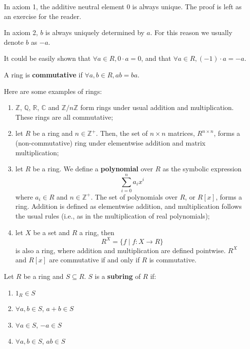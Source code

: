 \documentclass[12pt, a4paper, titlepage]{report}
\begin{document}
\begin{rem}
  In axiom 1, the additive neutral element $0$ is always unique. The proof is left as an exercise for the reader.
\end{rem}

\begin{rem}
  In axiom 2, $b$ is always uniquely determined by $a$. For this reason we usually denote $b$ as $-a$.
\end{rem}

\begin{rem}
  It could be easily shown that $\forall a \in R, 0 \cdot a = 0$, and that $\forall a \in R, (-1) \cdot a = -a$.
\end{rem}

\begin{defn}
  A ring is \textbf{commutative} if $\forall a, b \in R, ab = ba$.
\end{defn}

\begin{exmp}
  Here are some examples of rings:
  \begin{enumerate}
  \item $\mathbb{Z}$, $\mathbb{Q}$, $\mathbb{R}$, $\mathbb{C}$ and $\mathbb{Z}/n\mathbb{Z}$ form rings under usual
    addition and multiplication. These rings are all commutative;
  \item let $R$ be a ring and $n \in \mathbb{Z}^{+}$. Then, the set of $n \times n$ matrices, $R^{n \times n}$, forms a
    (non-commutative) ring under elementwise addition and matrix multiplication;
  \item let $R$ be a ring. We define a \textbf{polynomial} over $R$ as the symbolic expression
    \[
      \sum_{i = 0}^{n} a_{i}x^{i}
    \]
    where $a_i \in R$ and $n \in \mathbb{Z}^{+}$.
    The set of polynomials over $R$, or $R[x]$, forms a ring. Addition is defined as elementwise addition, and multiplication
    follows the usual rules (i.e., as in the multiplication of real polynomials);
  \item let $X$ be a set and $R$ a ring, then
    \[
      R^{X} = \{ f \mid f : X \rightarrow R \}
    \]
    is also a ring, where addition and multiplication are defined pointwise. $R^{X}$ and $R[x]$ are commutative if and only if
    $R$ is commutative.
  \end{enumerate}
\end{exmp}

\begin{defn}
  Let $R$ be a ring and $S \subseteq R$. $S$ is a \textbf{subring} of $R$ if:
  \begin{enumerate}
  \item $1_{R} \in S$
  \item $\forall a, b \in S$, $a + b \in S$
  \item $\forall a \in S$, $-a \in S$
  \item $\forall a, b \in S$, $ab \in S$
  \end{enumerate}
\end{defn}
\end{document}
